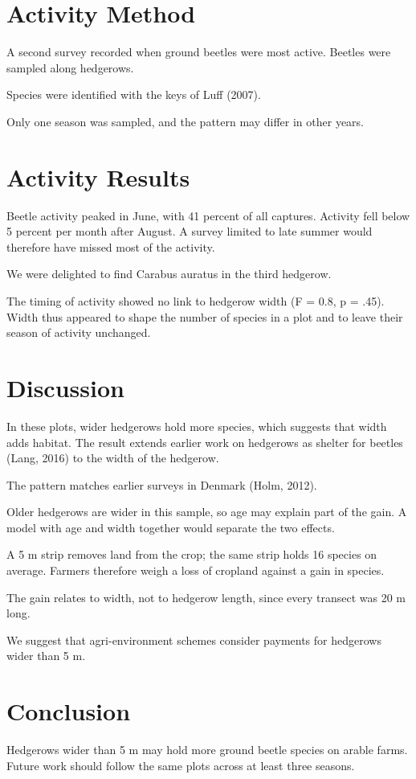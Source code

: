 \section{Activity Method}

A second survey recorded when ground beetles were most active. Beetles were sampled along hedgerows.

Species were identified with the keys of Luff (2007).

Only one season was sampled, and the pattern may differ in other years.

\section{Activity Results}

Beetle activity peaked in June, with 41 percent of all captures. Activity fell below 5 percent per month after August. A survey limited to late summer would therefore have missed most of the activity.

We were delighted to find Carabus auratus in the third hedgerow.

The timing of activity showed no link to hedgerow width (F = 0.8, p = .45). Width thus appeared to shape the number of species in a plot and to leave their season of activity unchanged.

\section{Discussion}

In these plots, wider hedgerows hold more species, which suggests that width adds habitat. The result extends earlier work on hedgerows as shelter for beetles (Lang, 2016) to the width of the hedgerow.

The pattern matches earlier surveys in Denmark (Holm, 2012).

Older hedgerows are wider in this sample, so age may explain part of the gain. A model with age and width together would separate the two effects.

A 5 m strip removes land from the crop; the same strip holds 16 species on average. Farmers therefore weigh a loss of cropland against a gain in species.

The gain relates to width, not to hedgerow length, since every transect was 20 m long.

We suggest that agri-environment schemes consider payments for hedgerows wider than 5 m.

\section{Conclusion}

Hedgerows wider than 5 m may hold more ground beetle species on arable farms. Future work should follow the same plots across at least three seasons.
